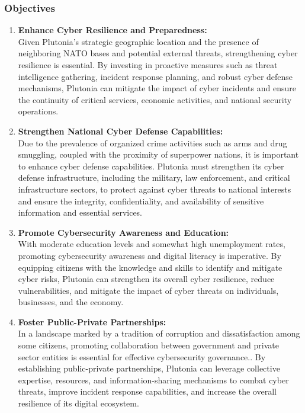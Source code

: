 \documentclass[
	a4paper, %
	12pt, %
]{CSSullivanBusinessReport}
\begin{document}
\begin{fullwidth}
\begin{justify}
\subsubsection{Objectives}
\begin{enumerate}
	\item \textbf{Enhance Cyber Resilience and Preparedness:} \\Given Plutonia's strategic geographic location and the presence of neighboring NATO bases and potential external threats, strengthening cyber resilience is essential. By investing in proactive measures such as threat intelligence gathering, incident response planning, and robust cyber defense mechanisms, Plutonia can mitigate the impact of cyber incidents and ensure the continuity of critical services, economic activities, and national security operations.
	\item \textbf{Strengthen National Cyber Defense Capabilities:} \\Due to the prevalence of organized crime activities such as arms and drug smuggling, coupled with the proximity of superpower nations, it is important to enhance cyber defense capabilities. Plutonia must strengthen its cyber defense infrastructure, including the military, law enforcement, and critical infrastructure sectors, to protect against cyber threats to national interests and ensure the integrity, confidentiality, and availability of sensitive information and essential services. 
	\item \textbf{Promote Cybersecurity Awareness and Education:} \\With moderate education levels and somewhat high unemployment rates, promoting cybersecurity awareness and digital literacy is imperative. By equipping citizens with the knowledge and skills to identify and mitigate cyber risks, Plutonia can strengthen its overall cyber resilience, reduce vulnerabilities, and mitigate the impact of cyber threats on individuals, businesses, and the economy.
	\item \textbf{Foster Public-Private Partnerships:} \\In a landscape marked by a tradition of corruption and dissatisfaction among some citizens, promoting collaboration between government and private sector entities is essential for effective cybersecurity governance.. By establishing public-private partnerships, Plutonia can leverage collective expertise, resources, and information-sharing mechanisms to combat cyber threats, improve incident response capabilities, and increase the overall resilience of its digital ecosystem.

\end{enumerate}
\end{justify}
\end{fullwidth}
\end{document}
